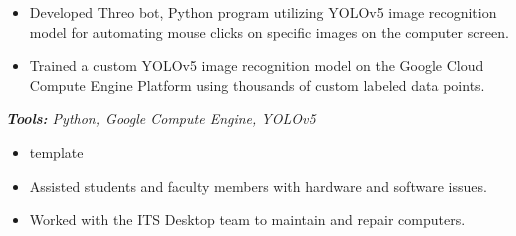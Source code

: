 \documentclass[10pt,letter]{altacv}
\begin{document}
\divider

\begin{itemize}
  \item Developed Threo bot, Python program utilizing YOLOv5 image recognition model for automating mouse clicks on specific images on the computer screen.
  \item Trained a custom YOLOv5 image recognition model on the Google Cloud Compute Engine Platform using thousands of custom labeled data points.
\end{itemize}
\textit{\textbf{Tools:} Python, Google Compute Engine, YOLOv5}



\medskip


\begin{itemize}
  \item template
\end{itemize}

\divider

\begin{itemize}
  \item Assisted students and faculty members with hardware and software issues.
  \item Worked with the ITS Desktop team to maintain and repair computers.
\end{itemize}

\divider
\end{document}

